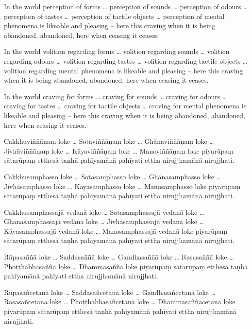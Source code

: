 
In the world perception of forms \ldots{} perception of sounds \ldots{}
perception of odours \ldots{} perception of tastes \ldots{} perception of
tactile objects \ldots{} perception of mental phenomena is likeable and pleasing
-- here this craving when it is being abandoned, abandoned, here when ceasing it
ceases.

In the world volition regarding forms \ldots{} volition regarding sounds
\ldots{} volition regarding odours \ldots{} volition regarding tastes \ldots{}
volition regarding tactile objects \ldots{} volition regarding mental phenomena
is likeable and pleasing -- here this craving when it is being abandoned,
abandoned, here when ceasing it ceases.

In the world craving for forms \ldots{} craving for sounds \ldots{} craving for
odours \ldots{} craving for tastes \ldots{} craving for tactile objects \ldots{}
craving for mental phenomena is likeable and pleasing -- here this craving when
it is being abandoned, abandoned, here when ceasing it ceases.

\paliPage

Cakkhuviññāṇaṃ loke \ldots{} Sotaviññāṇaṃ loke \ldots{} Ghānaviññāṇaṃ loke
\ldots{} Jivhāviññāṇaṃ loke \ldots{} Kāyaviññāṇaṃ loke \ldots{} Manoviññāṇaṃ
loke piyarūpaṃ sātarūpaṃ etthesā taṇhā pahīyamānā pahīyati ettha nirujjhamānā
nirujjhati.

Cakkhusamphasso loke \ldots{} Sotasamphasso loke \ldots{} Ghānasamphasso loke
\ldots{} Jivhāsamphasso loke \ldots{} Kāyasamphasso loke \ldots{} Manosamphasso
loke piyarūpaṃ sātarūpaṃ etthesā taṇhā pahīyamānā pahīyati ettha nirujjhamānā
nirujjhati.

Cakkhusamphassajā vedanā loke \ldots{} Sotasamphassajā vedanā loke \ldots{}
Ghānasamphassajā vedanā loke \ldots{} Jivhāsamphassajā vedanā loke \ldots{}
Kāyasamphassajā vedanā loke \ldots{} Manosamphassajā vedanā loke piyarūpaṃ
sātarūpaṃ etthesā taṇhā pahīyamānā pahīyati ettha nirujjhamānā nirujjhati.

Rūpasaññā loke \ldots{} Saddasaññā loke \ldots{} Gandhasaññā loke \ldots{}
Rasasaññā loke \ldots{} Phoṭṭhabbasaññā loke \ldots{} Dhammasaññā loke piyarūpaṃ
sātarūpaṃ etthesā taṇhā pahīyamānā pahīyati ettha nirujjhamānā nirujjhati.

Rūpasañcetanā loke \ldots{} Saddasañcetanā loke \ldots{} Gandhasañcetanā loke
\ldots{} Rasasañcetanā loke \ldots{} Phoṭṭhabbasañcetanā loke \ldots{}
Dhammasaññacetanā loke piyarūpaṃ sātarūpaṃ etthesā taṇhā pahīyamānā pahīyati
ettha nirujjhamānā nirujjhati.

